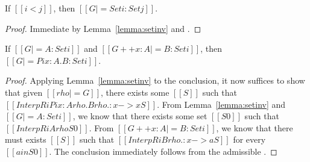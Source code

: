 \documentclass[acmsmall,screen=true,
\ifpublic review=false\else,review=true\fi
  ,anonymous=\ifanonymous true\else false\fi]{acmart}
\newcommand{\scw}[1]{}
\begin{document}




\begin{lemma}[ST-Set]
  \label{lemma:stset}
  If $[[i < j]]$, then $[[G |= Set i : Set j]]$.
\end{lemma}
\begin{proof}
  Immediate by Lemma~\ref{lemma:setinv} and .
\end{proof}

\begin{lemma}[ST-Pi]
  \label{lemma:stpi}
  If $[[G |= A : Set i]]$ and $[[G ++ x  : A |= B : Set i]]$, then $[[G |= Pi
  x : A . B : Set i]]$.
\end{lemma}
\begin{proof}
  Applying Lemma~\ref{lemma:setinv} to the
  conclusion, it now suffices to show that given $[[rho |= G]]$, there
  exists some $[[S]]$ such that $[[InterpR i Pi x : A{rho} . B{rho .:
    x -> x} S]]$.
  From Lemma~\ref{lemma:setinv} and $[[G |= A : Set i]]$, we know that
  there exists some set $[[S0]]$ such that $[[InterpR i A {rho} S0]]$.
From $[[G ++ x : A |= B : Set i]]$, we know that there must
exists $[[S]]$ such that $[[InterpR i B {rho .: x -> a} S]]$ for every $[[a
in S0]]$. The conclusion immediately follows from the admissible .
\end{proof}
\end{document}
